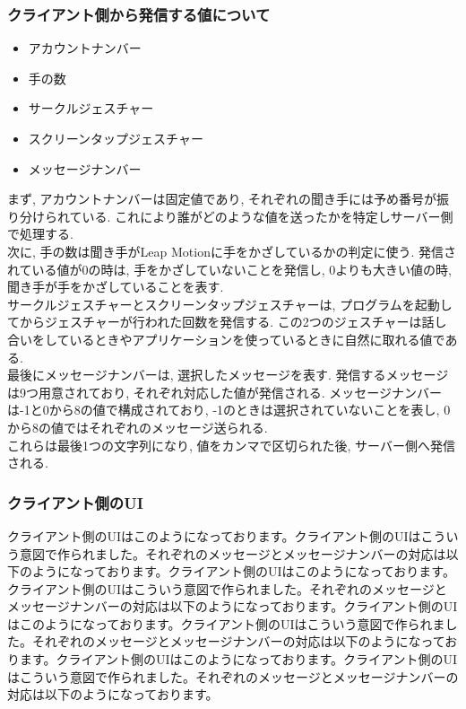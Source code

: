 \documentclass{funthesis}
\begin{document}
\subsubsection{クライアント側から発信する値について}
\begin{itemize}
 \item アカウントナンバー
 \item 手の数
 \item サークルジェスチャー
 \item スクリーンタップジェスチャー
 \item  メッセージナンバー
\end{itemize}
まず, アカウントナンバーは固定値であり, それぞれの聞き手には予め番号が振り分けられている. これにより誰がどのような値を送ったかを特定しサーバー側で処理する. \\
次に, 手の数は聞き手がLeap Motionに手をかざしているかの判定に使う. 発信されている値が0の時は, 手をかざしていないことを発信し, 0よりも大きい値の時, 聞き手が手をかざしていることを表す. \\
サークルジェスチャーとスクリーンタップジェスチャーは, プログラムを起動してからジェスチャーが行われた回数を発信する. この2つのジェスチャーは話し合いをしているときやアプリケーションを使っているときに自然に取れる値である. \\
最後にメッセージナンバーは, 選択したメッセージを表す. 発信するメッセージは9つ用意されており, それぞれ対応した値が発信される. メッセージナンバーは-1と0から8の値で構成されており, -1のときは選択されていないことを表し, 0から8の値ではそれぞれのメッセージ送られる. \\
これらは最後1つの文字列になり, 値をカンマで区切られた後, サーバー側へ発信される.  

\subsubsection{クライアント側のUI}
クライアント側のUIはこのようになっております。クライアント側のUIはこういう意図で作られました。それぞれのメッセージとメッセージナンバーの対応は以下のようになっております。クライアント側のUIはこのようになっております。クライアント側のUIはこういう意図で作られました。それぞれのメッセージとメッセージナンバーの対応は以下のようになっております。クライアント側のUIはこのようになっております。クライアント側のUIはこういう意図で作られました。それぞれのメッセージとメッセージナンバーの対応は以下のようになっております。クライアント側のUIはこのようになっております。クライアント側のUIはこういう意図で作られました。それぞれのメッセージとメッセージナンバーの対応は以下のようになっております。
\end{document}
